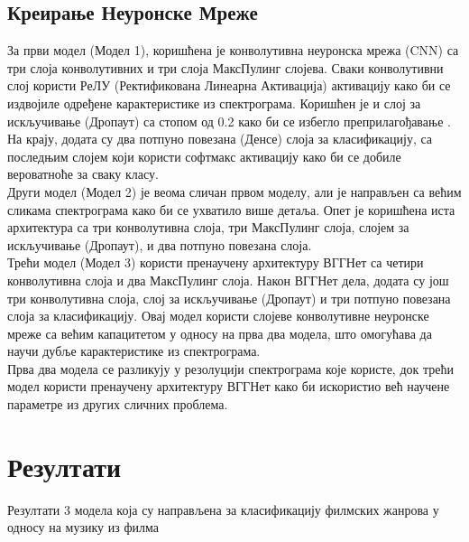 \documentclass{article}
\begin{document}
\newpage
\subsection{Креирање Неуронске Мреже}



За први модел (Модел 1), коришћена је  конволутивна неуронска мрежа (CNN) са три слоја конволутивних и три слоја МаксПулинг слојева. Сваки конволутивни слој користи РеЛУ (Ректификована Линеарна Активација) активацију како би се издвојиле одређене карактеристике из спектрограма. Коришћен је и слој за искључивање (Дропаут) са стопом од 0.2 како би се избегло преприлагођавање . На крају, додата су два потпуно повезана (Денсе) слоја за класификацију, са последњим слојем који користи софтмакс активацију како би се добиле вероватноће за сваку класу. \\

Други модел (Модел 2) је веома сличан првом моделу, али је направљен са већим сликама спектрограма како би се ухватило више детаља. Опет је коришћена иста архитектура са три конволутивна слоја, три МаксПулинг слоја, слојем за искључивање (Дропаут), и два потпуно повезана слоја. \\

Трећи модел (Модел 3) користи пренаучену архитектуру ВГГНет са четири конволутивна слоја и два МаксПулинг слоја. Након ВГГНет дела, додата су још три конволутивна слоја, слој за искључивање (Дропаут) и три потпуно повезана слоја за класификацију. Овај модел користи слојеве конволутивне неуронске мреже са већим капацитетом у односу на прва два модела, што омогућава да научи дубље карактеристике из спектрограма. \\

Прва два модела се разликују у резолуцији спектрограма које користе, док трећи модел користи пренаучену архитектуру ВГГНет како би искористио већ научене параметре из других сличних проблема.  \\




\section{Резултати}
Резултати 3 модела која су направљена за класификацију филмских жанрова у односу на музику из филма
\end{document}
